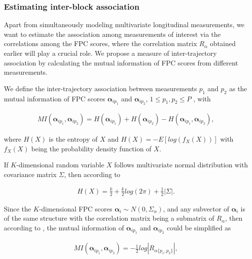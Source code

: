 \documentclass[aoas,preprint]{imsart}
\begin{document}
\subsubsection{Estimating inter-block association}
Apart from simultaneously modeling multivariate longitudinal measurements, we want to estimate the association among measurements of interest via the correlations among the FPC scores, where the correlation matrix $R_\alpha$ obtained earlier will play a crucial role. We propose a measure of inter-trajectory association by calculating the mutual information of FPC scores from different measurements. %

We define the inter-trajectory association between measurements $p_1$ and $p_2$ as the mutual information of FPC scores $\boldsymbol{\alpha}_{ip_1}$ and $\boldsymbol{\alpha}_{ip_2}$, $1 \leq p_1, p_2  \leq P$ , with

\begin{align*}
MI(\boldsymbol{\alpha}_{ip_1}, \boldsymbol{\alpha}_{ip_2}) = H(\boldsymbol{\alpha}_{ip_1}) + H(\boldsymbol{\alpha}_{ip_2}) - H(\boldsymbol{\alpha}_{ip_1}, \boldsymbol{\alpha}_{ip_2}), 
\end{align*}

where $H(X)$ is the entropy of $X$ and $H(X) = -E[log(f_{X}(X))]$ with $f_{X}(X)$ being the probability density function of $X$\citep{cover1999elements}.

If $K$-dimensional random variable $X$ follows multivariate normal distribution with covariance matrix $\Sigma$, then according to \citet{ahmed1989entropy}

\begin{align*}
H(X) = \frac{k}{2} + \frac{k}{2} log(2 \pi) + \frac{1}{2} |\Sigma|. 
\end{align*} 

Since the $K$-dimensional FPC scores $\boldsymbol\alpha_i  \sim N(0,\Sigma_\alpha)$, and any subvector of $\boldsymbol\alpha_i$ is of the same structure with the correlation matrix being a submatrix of $R_\alpha$, then according to \citet{arellano2013shannon}, the mutual information of $\boldsymbol{\alpha}_{ip_1}$ and $\boldsymbol{\alpha}_{ip_2}$ could be simplified as

\begin{equation}
\begin{aligned}
MI(\boldsymbol{\alpha}_{ip_1}, \boldsymbol{\alpha}_{ip_2}) =  -\frac{1}{2} log|R_{\alpha\{p_1, p_2\}}|, \label{eq:MI}
\end{aligned}
\end{equation}
\end{document}
